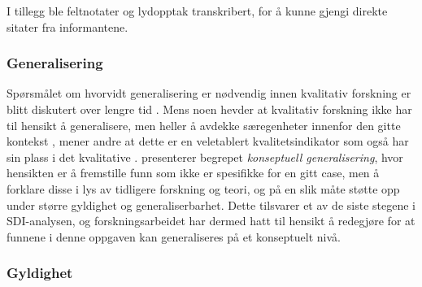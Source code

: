 I tillegg ble feltnotater og lydopptak transkribert, for å kunne gjengi direkte sitater fra informantene.



\subsubsection{Generalisering}
Spørsmålet om hvorvidt generalisering er nødvendig innen kvalitativ forskning er blitt diskutert over lengre tid \citep{Tjora}. Mens noen hevder at kvalitativ forskning ikke har til hensikt å generalisere, men heller å avdekke særegenheter innenfor den gitte kontekst \citep{Creswell, Oates}, mener andre at dette er en veletablert kvalitetsindikator som også har sin plass i det kvalitative \citep{Tjora}. \citet{Tjora} presenterer begrepet \textit{konseptuell generalisering}, hvor hensikten er å fremstille funn som ikke er spesifikke for en gitt case, men å forklare disse i lys av tidligere forskning og teori, og på en slik måte støtte opp under større gyldighet og generaliserbarhet. Dette tilsvarer et av de siste stegene i SDI-analysen, og forskningsarbeidet har dermed hatt til hensikt å redegjøre for at funnene i denne oppgaven kan generaliseres på et konseptuelt nivå. 

\subsubsection{Gyldighet}
